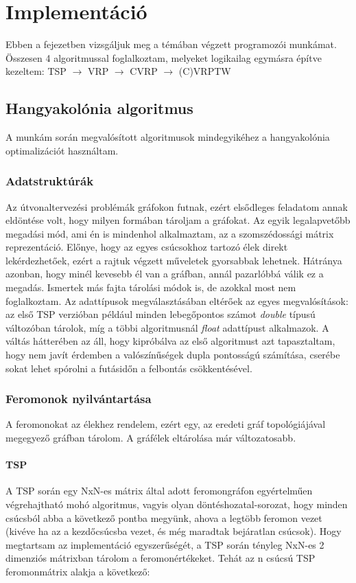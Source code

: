 \chapter{Implementáció} \label{implementationChapter}

Ebben a fejezetben vizsgáljuk meg a témában végzett programozói munkámat. Összesen 4 algoritmussal foglalkoztam, melyeket logikailag egymásra építve kezeltem:
TSP  \(\rightarrow\) VRP \(\rightarrow\) CVRP \(\rightarrow\) (C)VRPTW

\section{Hangyakolónia algoritmus}
A munkám során megvalósított algoritmusok mindegyikéhez a hangyakolónia optimalizációt használtam.

\subsection{Adatstruktúrák}
Az útvonaltervezési problémák gráfokon futnak, ezért elsődleges feladatom annak eldöntése volt, hogy milyen formában tároljam a gráfokat. Az egyik legalapvetőbb megadási mód, ami én is mindenhol alkalmaztam, az a szomszédossági mátrix reprezentáció. Előnye, hogy az egyes csúcsokhoz tartozó élek direkt lekérdezhetőek, ezért a rajtuk végzett műveletek gyorsabbak lehetnek. Hátránya azonban, hogy minél kevesebb él van a gráfban, annál pazarlóbbá válik ez a megadás. Ismertek más fajta tárolási módok is, de azokkal most nem foglalkoztam. \cite{alg_optim}
Az adattípusok megválasztásában eltérőek az egyes megvalósítások: az első TSP verzióban például minden lebegőpontos számot \textit{double} típusú változóban tárolok, míg a többi algoritmusnál \textit{float} adattípust alkalmazok. A váltás hátterében az áll, hogy kipróbálva az első algoritmust azt tapasztaltam, hogy nem javít érdemben a valószínűségek dupla pontosságú számítása, cserébe sokat lehet spórolni a futásidőn a felbontás csökkentésével.


\subsection{Feromonok nyilvántartása}
A feromonokat az élekhez rendelem, ezért egy, az eredeti gráf topológiájával megegyező gráfban tárolom. A gráfélek eltárolása már változatosabb.

\subsubsection{TSP}
A TSP során egy NxN-es mátrix által adott feromongráfon egyértelműen végrehajtható mohó algoritmus, vagyis olyan döntéshozatal-sorozat, hogy minden csúcsból abba a következő pontba megyünk, ahova a legtöbb feromon vezet (kivéve ha az a kezdőcsúcsba vezet, és még maradtak bejáratlan csúcsok). Hogy megtartsam az implementáció egyszerűségét, a TSP során tényleg NxN-es 2 dimenziós mátrixban tárolom a feromonértékeket. Tehát az n csúcsú TSP feromonmátrix alakja a következő:

